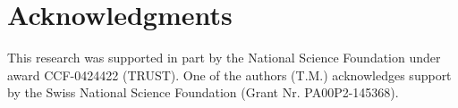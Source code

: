 \documentclass{sigchi}
\begin{document}
\section{Acknowledgments}
This research was supported in part by the National Science Foundation under award CCF-0424422 (TRUST). One of the authors (T.M.) acknowledges support by the Swiss National Science Foundation (Grant Nr.  PA00P2-145368).

%
%
%
%
%

\balance


%
%

\end{document}
